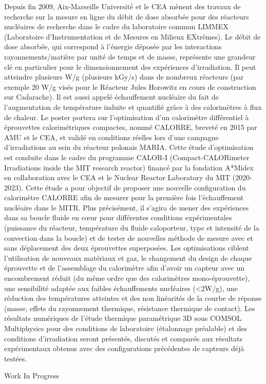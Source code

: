 {\normalsize
Depuis fin 2009, Aix-Marseille Université et le CEA mènent des travaux de recherche sur la mesure en ligne du débit de dose absorbée pour des réacteurs nucléaires de recherche dans le cadre du laboratoire commun LIMMEX (Laboratoire d'Instrumentation et de Mesures en Milieux EXtrêmes). Le débit de dose absorbée, qui correspond à l'énergie déposée par les interactions rayonnements/matière par unité de temps et de masse, représente une grandeur clé en particulier pour le dimensionnement des expériences d'irradiation. Il peut atteindre plusieurs W/g (plusieurs kGy/s) dans de nombreux réacteurs (par exemple 20 W/g visés pour le Réacteur Jules Horowitz en cours de construction sur Cadarache). Il est aussi appelé échauffement nucléaire du fait de l'augmentation de température induite et quantifié grâce à des calorimètres à flux de chaleur. Le poster portera sur l'optimisation d'un calorimètre différentiel à éprouvettes calorimétriques compactes, nommé CALORRE, breveté en 2015 par AMU et le CEA, et validé en conditions réelles lors d'une campagne d'irradiations au sein du réacteur polonais MARIA. Cette étude d'optimisation est conduite dans le cadre du programme CALOR-I (Compact-CALORimeter Irradiations inside the MIT research reactor) financé par la fondation A*Midex en collaboration avec le CEA et le Nuclear Reactor Laboratory du MIT (2020-2023). Cette étude a pour objectif de proposer une nouvelle configuration du calorimètre CALORRE afin de mesurer pour la première fois l'échauffement nucléaire dans le MITR. Plus précisément, il s'agira de mener des expériences dans sa boucle fluide en cœur pour différentes conditions expérimentales (puissance du réacteur, température du fluide caloporteur, type et intensité de la convection dans la boucle) et de tester de nouvelles méthode de mesure avec et sans déplacement des deux éprouvettes superposées. Les optimisations ciblent l'utilisation de nouveaux matériaux et gaz, le changement du design de chaque éprouvette et de l'assemblage du calorimètre afin d'avoir un capteur avec un encombrement réduit (du même ordre que des calorimètres mono-éprouvette), une sensibilité adaptée aux faibles échauffements nucléaires (<2W/g), une réduction des températures atteintes et des non linéarités de la courbe de réponse (masse, effets du rayonnement thermique, résistance thermique de contact). Les résultats numériques de l'étude thermique paramétrique 3D sous COMSOL Multiphysics pour des conditions de laboratoire (étalonnage préalable) et des conditions d'irradiation seront présentés, discutés et comparés aux résultats expérimentaux obtenus avec des configurations précédentes de capteurs déjà testées.

 \vfill Work In Progress

}
 
